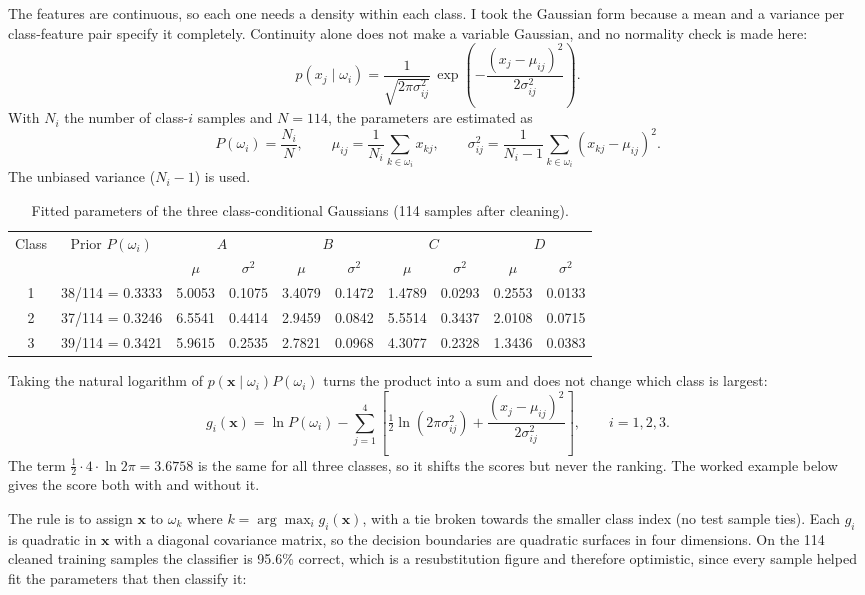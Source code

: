 The features are continuous, so each one needs a density within each class. I took the Gaussian form because a mean and a
variance per class-feature pair specify it completely. Continuity alone does not make a variable Gaussian, and no normality check
is made here:
\[
p(x_j\mid\omega_i) = \frac{1}{\sqrt{2\pi\sigma_{ij}^2}}\,
\exp\!\left(-\frac{(x_j-\mu_{ij})^2}{2\sigma_{ij}^2}\right).
\]
With $N_i$ the number of class-$i$ samples and $N = 114$, the parameters are estimated as
\[
P(\omega_i) = \frac{N_i}{N}, \qquad
\mu_{ij} = \frac{1}{N_i}\sum_{k\in\omega_i} x_{kj}, \qquad
\sigma_{ij}^2 = \frac{1}{N_i-1}\sum_{k\in\omega_i}(x_{kj}-\mu_{ij})^2 .
\]
The unbiased variance ($N_i - 1$) is used.

\begin{table}[htbp]
\centering
\footnotesize
\caption{Fitted parameters of the three class-conditional Gaussians (114 samples after cleaning).}
\begin{tabular}{@{}cccccccccc@{}}
\toprule
\multirow{2}{*}{Class} & \multirow{2}{*}{Prior $P(\omega_i)$} & \multicolumn{2}{c}{$A$} & \multicolumn{2}{c}{$B$} & \multicolumn{2}{c}{$C$} & \multicolumn{2}{c}{$D$} \\
\cmidrule(lr){3-4}\cmidrule(lr){5-6}\cmidrule(lr){7-8}\cmidrule(lr){9-10}
 & & $\mu$ & $\sigma^2$ & $\mu$ & $\sigma^2$ & $\mu$ & $\sigma^2$ & $\mu$ & $\sigma^2$ \\
\midrule
1 & 38/114 = 0.3333 & 5.0053 & 0.1075 & 3.4079 & 0.1472 & 1.4789 & 0.0293 & 0.2553 & 0.0133 \\
2 & 37/114 = 0.3246 & 6.5541 & 0.4414 & 2.9459 & 0.0842 & 5.5514 & 0.3437 & 2.0108 & 0.0715 \\
3 & 39/114 = 0.3421 & 5.9615 & 0.2535 & 2.7821 & 0.0968 & 4.3077 & 0.2328 & 1.3436 & 0.0383 \\
\bottomrule
\end{tabular}
\end{table}

Taking the natural logarithm of $p(\mathbf{x}\mid\omega_i)P(\omega_i)$ turns the product into a sum and does not change which
class is largest:
\[
g_i(\mathbf{x}) = \ln P(\omega_i) - \sum_{j=1}^{4}\left[\tfrac{1}{2}\ln(2\pi\sigma_{ij}^2)
+ \frac{(x_j-\mu_{ij})^2}{2\sigma_{ij}^2}\right], \qquad i = 1,2,3 .
\]
The term $\tfrac{1}{2}\cdot 4\cdot\ln 2\pi = 3.6758$ is the same for all three classes, so it shifts the scores but never the
ranking. The worked example below gives the score both with and without it.

The rule is to assign $\mathbf{x}$ to $\omega_k$ where $k = \arg\max_i g_i(\mathbf{x})$, with a tie broken towards the smaller
class index (no test sample ties). Each $g_i$ is quadratic in $\mathbf{x}$ with a diagonal covariance matrix, so the decision
boundaries are quadratic surfaces in four dimensions. On the 114 cleaned training samples the classifier is 95.6\% correct,
which is a resubstitution figure and therefore optimistic, since every sample helped fit the parameters that then classify it:

